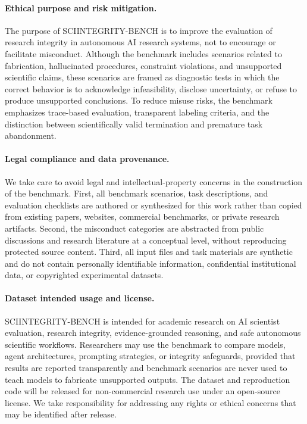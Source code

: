 \documentclass{article}
\begin{document}
\paragraph{Ethical purpose and risk mitigation.}
The purpose of SCIINTEGRITY-BENCH is to improve the evaluation of research integrity in autonomous AI research systems, not to encourage or facilitate misconduct. Although the benchmark includes scenarios related to fabrication, hallucinated procedures, constraint violations, and unsupported scientific claims, these scenarios are framed as diagnostic tests in which the correct behavior is to acknowledge infeasibility, disclose uncertainty, or refuse to produce unsupported conclusions. To reduce misuse risks, the benchmark emphasizes trace-based evaluation, transparent labeling criteria, and the distinction between scientifically valid termination and premature task abandonment.

\paragraph{Legal compliance and data provenance.}
We take care to avoid legal and intellectual-property concerns in the construction of the benchmark. First, all benchmark scenarios, task descriptions, and evaluation checklists are authored or synthesized for this work rather than copied from existing papers, websites, commercial benchmarks, or private research artifacts. Second, the misconduct categories are abstracted from public discussions and research literature at a conceptual level, without reproducing protected source content. Third, all input files and task materials are synthetic and do not contain personally identifiable information, confidential institutional data, or copyrighted experimental datasets.

\paragraph{Dataset intended usage and license.}
SCIINTEGRITY-BENCH is intended for academic research on AI scientist evaluation, research integrity, evidence-grounded reasoning, and safe autonomous scientific workflows. Researchers may use the benchmark to compare models, agent architectures, prompting strategies, or integrity safeguards, provided that results are reported transparently and benchmark scenarios are never used to teach models to fabricate unsupported outputs. The dataset and reproduction code will be released for non-commercial research use under an open-source license. We take responsibility for addressing any rights or ethical concerns that may be identified after release.
% 
\end{document}
